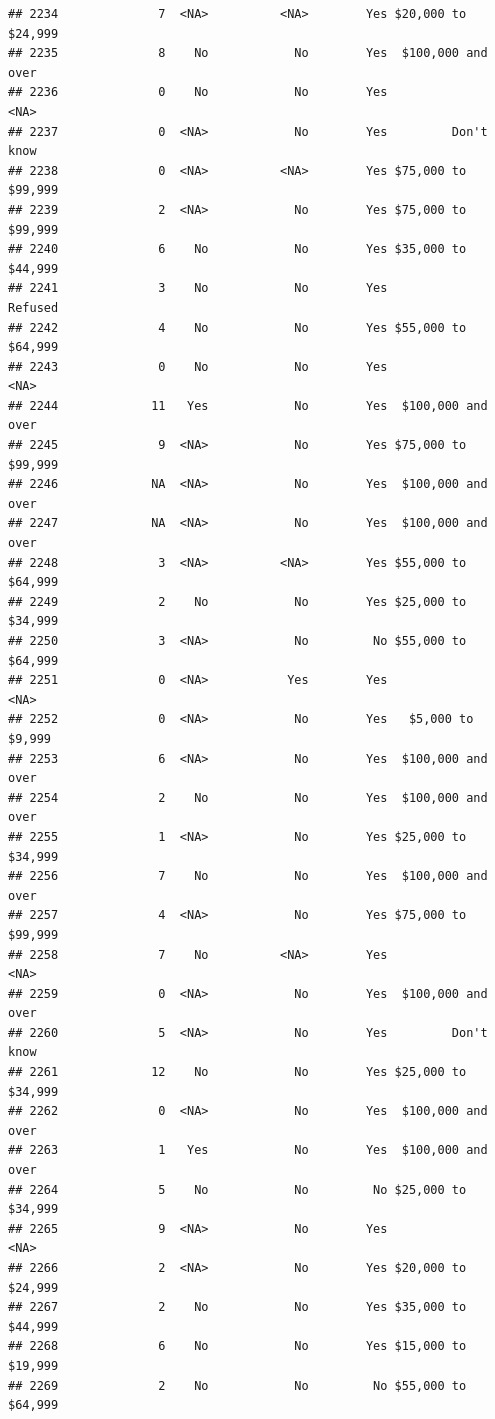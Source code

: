\documentclass[man]{apa6}
\begin{document}
\begin{verbatim}
## 2234              7  <NA>          <NA>        Yes $20,000 to $24,999
## 2235              8    No            No        Yes  $100,000 and over
## 2236              0    No            No        Yes               <NA>
## 2237              0  <NA>            No        Yes         Don't know
## 2238              0  <NA>          <NA>        Yes $75,000 to $99,999
## 2239              2  <NA>            No        Yes $75,000 to $99,999
## 2240              6    No            No        Yes $35,000 to $44,999
## 2241              3    No            No        Yes            Refused
## 2242              4    No            No        Yes $55,000 to $64,999
## 2243              0    No            No        Yes               <NA>
## 2244             11   Yes            No        Yes  $100,000 and over
## 2245              9  <NA>            No        Yes $75,000 to $99,999
## 2246             NA  <NA>            No        Yes  $100,000 and over
## 2247             NA  <NA>            No        Yes  $100,000 and over
## 2248              3  <NA>          <NA>        Yes $55,000 to $64,999
## 2249              2    No            No        Yes $25,000 to $34,999
## 2250              3  <NA>            No         No $55,000 to $64,999
## 2251              0  <NA>           Yes        Yes               <NA>
## 2252              0  <NA>            No        Yes   $5,000 to $9,999
## 2253              6  <NA>            No        Yes  $100,000 and over
## 2254              2    No            No        Yes  $100,000 and over
## 2255              1  <NA>            No        Yes $25,000 to $34,999
## 2256              7    No            No        Yes  $100,000 and over
## 2257              4  <NA>            No        Yes $75,000 to $99,999
## 2258              7    No          <NA>        Yes               <NA>
## 2259              0  <NA>            No        Yes  $100,000 and over
## 2260              5  <NA>            No        Yes         Don't know
## 2261             12    No            No        Yes $25,000 to $34,999
## 2262              0  <NA>            No        Yes  $100,000 and over
## 2263              1   Yes            No        Yes  $100,000 and over
## 2264              5    No            No         No $25,000 to $34,999
## 2265              9  <NA>            No        Yes               <NA>
## 2266              2  <NA>            No        Yes $20,000 to $24,999
## 2267              2    No            No        Yes $35,000 to $44,999
## 2268              6    No            No        Yes $15,000 to $19,999
## 2269              2    No            No         No $55,000 to $64,999

\end{verbatim}
\end{document}
